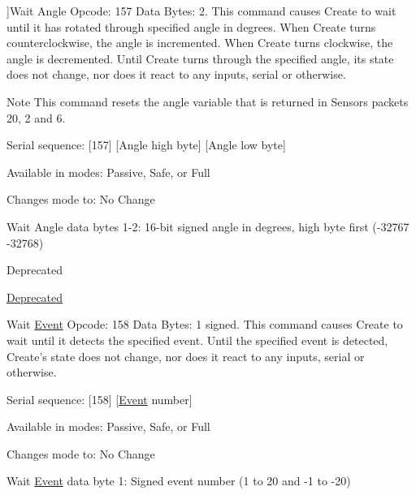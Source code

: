 \begin{Desc}
\begin{description}
{}]Wait Angle Opcode\+: 157 Data Bytes\+: 2. This command causes Create to wait until it has rotated through specified angle in degrees. When Create turns counterclockwise, the angle is incremented. When Create turns clockwise, the angle is decremented. Until Create turns through the specified angle, its state does not change, nor does it react to any inputs, serial or otherwise. \begin{DoxyNote}{Note}
This command resets the angle variable that is returned in Sensors packets 20, 2 and 6.
\begin{DoxyItemize}
\item Serial sequence\+: \mbox{[}157\mbox{]} \mbox{[}Angle high byte\mbox{]} \mbox{[}Angle low byte\mbox{]}
\item Available in modes\+: Passive, Safe, or Full
\item Changes mode to\+: No Change
\item Wait Angle data bytes 1-\/2\+: 16-\/bit signed angle in degrees, high byte first (-\/32767 -\/32768)
\end{DoxyItemize}
\end{DoxyNote}
\begin{DoxyRefDesc}{Deprecated}
\item[\hyperlink{deprecated__deprecated000009}{Deprecated}]\end{DoxyRefDesc}
\item[{\em 
\hypertarget{group__roomba-lib_gga305e17dfb7050ad83ea49ded2e6a2e24a4c81a6746d2eacab9a179c21531658fd}{}W\+A\+I\+T\+\_\+\+E\+V\+E\+N\+T\label{group__roomba-lib_gga305e17dfb7050ad83ea49ded2e6a2e24a4c81a6746d2eacab9a179c21531658fd}
}]Wait \hyperlink{structEvent}{Event} Opcode\+: 158 Data Bytes\+: 1 signed. This command causes Create to wait until it detects the specified event. Until the specified event is detected, Create’s state does not change, nor does it react to any inputs, serial or otherwise.
\begin{DoxyItemize}
\item Serial sequence\+: \mbox{[}158\mbox{]} \mbox{[}\hyperlink{structEvent}{Event} number\mbox{]}
\item Available in modes\+: Passive, Safe, or Full
\item Changes mode to\+: No Change
\item Wait \hyperlink{structEvent}{Event} data byte 1\+: Signed event number (1 to 20 and -\/1 to -\/20)
\end{DoxyItemize}


\end{description}
\end{Desc}
